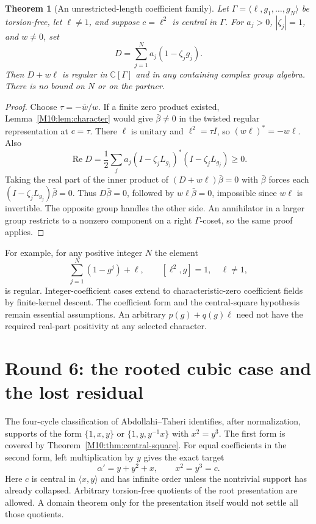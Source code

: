 \documentclass[11pt,a4paper,oneside]{report}
\newtheorem{theorem}{Theorem}[section]
\theoremstyle{definition}
\theoremstyle{remark}
\DeclareMathOperator{\Rea}{Re}
\newcommand{\C}{\mathbb C}
\begin{document}
\begin{theorem}[An unrestricted-length coefficient family]\label{M10:thm:positive}
Let $\Gamma=\langle\ell,g_1,\ldots,g_N\rangle$ be torsion-free,
let $\ell\ne1$, and suppose $c=\ell^2$ is central in $\Gamma$.
For $a_j>0$, $|\zeta_j|=1$, and $w\ne0$, set
\[
D=\sum_{j=1}^N a_j(1-\zeta_jg_j).
\]
Then $D+w\ell$ is regular in $\C[\Gamma]$ and in any containing
complex group algebra. There is no bound on $N$ or on the partner.
\end{theorem}
\begin{proof}
Choose $\tau=-\overline w/w$. If a finite zero product existed,
Lemma~\ref{M10:lem:character} would give $\bar\beta\ne0$ in the
twisted regular representation at $c=\tau$. There
$\ell$ is unitary and $\ell^2=\tau I$, so
$(w\ell)^*=-w\ell$. Also
\[
\Rea D=\frac12\sum_j a_j
(I-\zeta_jL_{g_j})^*(I-\zeta_jL_{g_j})\ge0.
\]
Taking the real part of the inner product of
$(D+w\ell)\bar\beta=0$ with $\bar\beta$ forces each
$(I-\zeta_jL_{g_j})\bar\beta=0$. Thus $D\bar\beta=0$,
followed by $w\ell\bar\beta=0$, impossible since $w\ell$
is invertible. The opposite group handles the other side.
An annihilator in a larger group restricts to a nonzero component
on a right $\Gamma$-coset, so the same proof applies.
\end{proof}

For example, for any positive integer $N$ the element
\[
\sum_{j=1}^N(1-g^j)+\ell,\qquad [\ell^2,g]=1,\quad\ell\ne1,
\]
is regular. Integer-coefficient cases extend to characteristic-zero
coefficient fields by finite-kernel descent. The coefficient form
and the central-square hypothesis remain essential assumptions.
An arbitrary $p(g)+q(g)\ell$ need not have the required real-part
positivity at any selected character.

\section{Round 6: the rooted cubic case and the lost residual}
The four-cycle classification of Abdollahi--Taheri
\cite[Theorem 2.15]{B:ATsmall} identifies, after normalization, supports
of the form $\{1,x,y\}$ or $\{1,y,y^{-1}x\}$ with $x^2=y^3$.
The first form is covered by Theorem~\ref{M10:thm:central-square}.
For equal coefficients in the second form, left multiplication
by $y$ gives the exact target
\begin{equation}\label{M10:eq:rooted}
\alpha'=y+y^2+x,\qquad x^2=y^3=c.
\end{equation}
Here $c$ is central in $\langle x,y\rangle$ and has infinite order
unless the nontrivial support has already collapsed. Arbitrary
torsion-free quotients of the root presentation are allowed.
A domain theorem only for the presentation itself would not settle
all those quotients.
\end{document}
